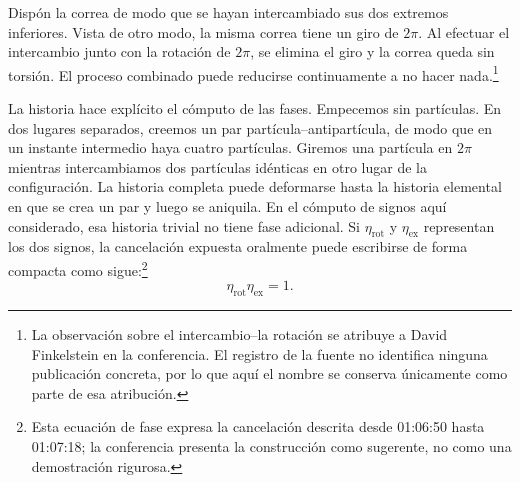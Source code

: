 Dispón la correa de modo que se hayan intercambiado sus dos extremos inferiores. Vista de otro modo, la misma correa tiene un giro de \(2\pi\). Al efectuar el intercambio junto con la rotación de \(2\pi\), se elimina el giro y la correa queda sin torsión. El proceso combinado puede reducirse continuamente a no hacer nada.\footnote{La observación sobre el intercambio--la rotación se atribuye a David Finkelstein en la conferencia. El registro de la fuente no identifica ninguna publicación concreta, por lo que aquí el nombre se conserva únicamente como parte de esa atribución.}

\begin{classroomqa}
\end{classroomqa}

La historia hace explícito el cómputo de las fases. Empecemos sin partículas. En dos lugares separados, creemos un par partícula--antipartícula, de modo que en un instante intermedio haya cuatro partículas. Giremos una partícula en \(2\pi\) mientras intercambiamos dos partículas idénticas en otro lugar de la configuración. La historia completa puede deformarse hasta la historia elemental en que se crea un par y luego se aniquila. En el cómputo de signos aquí considerado, esa historia trivial no tiene fase adicional. Si \(\eta_{\mathrm{rot}}\) y \(\eta_{\mathrm{ex}}\) representan los dos signos, la cancelación expuesta oralmente puede escribirse de forma compacta como sigue:\footnote{Esta ecuación de fase expresa la cancelación descrita desde 01:06:50 hasta 01:07:18; la conferencia presenta la construcción como sugerente, no como una demostración rigurosa.}
\begin{equation}
\eta_{\mathrm{rot}}\eta_{\mathrm{ex}}=1.
\end{equation}

\begin{classroomqa}
\end{classroomqa}

